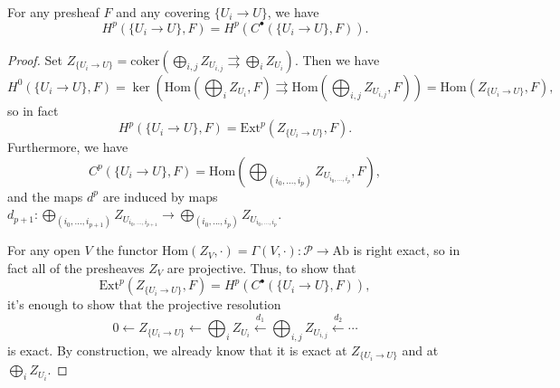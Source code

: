 \begin{thm}\label{cech} For any presheaf $F$ and any covering $\{U_i\rightarrow U\}$, we have
\[
H^p(\{U_i\rightarrow U\},F) = H^p(C^\bullet(\{U_i\rightarrow U\},F)).
\]
\end{thm}
\begin{proof} Set $Z_{\{U_i\rightarrow U\}} = \mbox{coker}(\bigoplus_{i,j} Z_{U_{i,j}}\rightrightarrows \bigoplus_i Z_{U_i})$. Then we have
\[
H^0(\{U_i\rightarrow U\},F) = \ker(\mbox{Hom}(\bigoplus_i Z_{U_i},F) \rightrightarrows \mbox{Hom}(\bigoplus_{i,j} Z_{U_{i,j}},F)) = \mbox{Hom}(Z_{\{U_i\rightarrow U\}},F),
\]
so in fact
\[
H^p(\{U_i\rightarrow U\},F) = \mbox{Ext}^p(Z_{\{U_i\rightarrow U\}},F).
\]
Furthermore, we have
\[
C^p(\{U_i\rightarrow U\}, F) = \mbox{Hom}(\bigoplus_{(i_0, ..., i_p)} Z_{U_{i_0, ..., i_p}}, F),
\]
and the maps $d^p$ are induced by maps $d_{p+1}: \bigoplus_{(i_0, ..., i_{p+1})} Z_{U_{i_0, ..., i_{p+1}}} \rightarrow \bigoplus_{(i_0, ..., i_p)} Z_{U_{i_0, ..., i_p}}$.

For any open $V$ the functor $\mbox{Hom}(Z_V,\cdot) = \Gamma(V,\cdot):\mathcal{P} \rightarrow \mbox{Ab}$ is right exact, so in fact all of the presheaves $Z_V$ are projective. Thus, to show that
\[
\mbox{Ext}^p(Z_{\{U_i\rightarrow U\}},F) = H^p(C^\bullet(\{U_i\rightarrow U\}, F)),
\]
it's enough to show that the projective resolution
\[
0 \leftarrow Z_{\{U_i\rightarrow U\}} \leftarrow \bigoplus_i Z_{U_i} \stackrel{d_1}{\longleftarrow} \bigoplus_{i,j} Z_{U_{i,j}} \stackrel{d_2}{\longleftarrow} \cdots
\]
is exact. By construction, we already know that it is exact at $Z_{\{U_i\rightarrow U\}}$ and at $\bigoplus_i Z_{U_i}$.


\end{proof}
